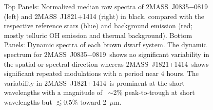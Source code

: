 \documentclass[twocolumn]{aastex6}
\newcommand{\sha}{2MASS~J0835$-$0819}
\newcommand{\shb}{2MASS~J1821+1414}
\begin{document}

\begin{figure}[!t]
\centering
{}
	\caption{Top Panels: Normalized median raw spectra of {\sha} (left) and {\shb} (right) in black, compared with the respective reference stars (blue) and background emission (red; mostly telluric OH emission and thermal background).  Bottom Panels: Dynamic spectra of each brown dwarf system. The dynamic spectrum for \sha\ shows no significant variability in the spatial or spectral direction whereas \shb\ shows significant repeated modulations with a period near 4 hours.
The variability in \shb\ is prominent at the short wavelengths with a magnitude of ~$\sim$2\% peak-to-trough at short wavelengths but $\lesssim 0.5\%$ toward 2~$\mu$m.}
	\label{fig:specphot}
	\vspace{0.1in}
\end{figure} 
\end{document}
